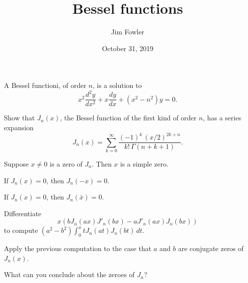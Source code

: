 \documentclass{homework}
\author{Jim Fowler}
\title{Bessel functions}
\date{October 31, 2019}
\begin{document}
\maketitle


A Bessel functioni, of order $n$, is a solution to
\[
\displaystyle x^{2}{\frac {d^{2}y}{dx^{2}}}+x{\frac {dy}{dx}}+\left(x^{2}-n ^{2}\right)y=0.
\]

\begin{problem}
Show that $J_n(x)$, the Bessel function of the first kind of order $n$, has a series expansion
\[
  J_n(x) = \sum_{k=0}^\infty \frac{(-1)^k \, (x/2)^{2k + n}}{k! \, \Gamma(n + k + 1)}.
\]
\end{problem}

\begin{problem}
  Suppose $x \neq 0$ is a zero of $J_n$.  Then $x$ is a simple zero.
\end{problem}

\begin{problem}
  If $J_n(x) = 0$, then $J_n(-x) = 0$.
\end{problem}

\begin{problem}
  If $J_n(x) = 0$, then $J_n(\bar{x}) = 0$.
\end{problem}

\begin{problem}
  Differentiate
  \[
    x \left( b J_n(ax) J'_n(bx) - a J'_n(ax) J_n(bx) \right)
  \]
  to compute
   $(a^2-b^2) \int_0^x t J_n(at) J_n(bt) \, dt$.
\end{problem}

\vfill

\begin{problem}
  Apply the previous computation to the case that  $a$ and $b$ are conjugate zeros of $J_n(x)$.
\end{problem}

\vfill

\begin{problem}
  What can you conclude about the zeroes of $J_n$?
\end{problem}

\vfill
\end{document}
